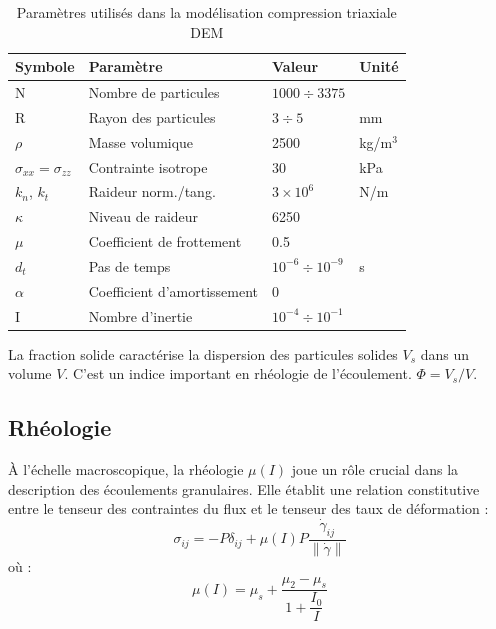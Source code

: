 \documentclass[5p,authoryear,square]{elsarticle}
\begin{document}
\begin{table}[htbp]
\centering
\footnotesize
\begin{tabular}{@{}llll@{}}
\toprule
\textbf{Symbole} & \textbf{Paramètre} & \textbf{Valeur} & \textbf{Unité} \\
\midrule
N & Nombre de particules & $1000 \div 3375$ &  \\
R & Rayon des particules & $3 \div 5 $& mm \\
$\rho$ & Masse volumique & 2500 & kg/m$^3$ \\
$\sigma_{xx} = \sigma_{zz}$ & Contrainte isotrope & 30 & kPa \\
$k_n$, $k_t$ & Raideur norm./tang. & $3 \times 10^6$ & N/m \\
$\kappa$ & Niveau de raideur & 6250 &  \\
$\mu$ & Coefficient de frottement & 0.5 &  \\
$d_t$ & Pas de temps & $10^{-6} \div 10^{-9}$ & s \\
$\alpha$ & Coefficient d'amortissement & 0 &  \\
I & Nombre d'inertie & $10^{-4} \div 10^{-1}$ &  \\
\bottomrule
\end{tabular}
\caption{Paramètres utilisés dans la modélisation compression triaxiale DEM}
\label{parametres_triaxiale}
\end{table}


La fraction solide caractérise la dispersion des particules solides $V_s$ dans un volume $V$.  
C'est un indice important en rhéologie de l'écoulement.  $\Phi = V_s/V$.


\subsection{Rhéologie}\label{rheologie}

À l'échelle macroscopique, la rhéologie $\mu(I)$ joue un rôle crucial dans la description des écoulements granulaires. Elle établit une relation constitutive entre le tenseur des contraintes du flux et le tenseur des taux de déformation  \citep{jop2006constitutive} :
\begin{equation}
\sigma_{ij} = -P \delta_{ij} + \mu(I) P \frac{\dot{\gamma}_{ij}}{\lVert \dot{\gamma} \rVert}
\label{flowTensor}
\end{equation}
où :
\begin{equation}
\mu(I) = \mu_s + \dfrac{\mu_2 - \mu_s}{1 + \dfrac{I_0}{I}}
\label{muI}
\end{equation}
\end{document}
